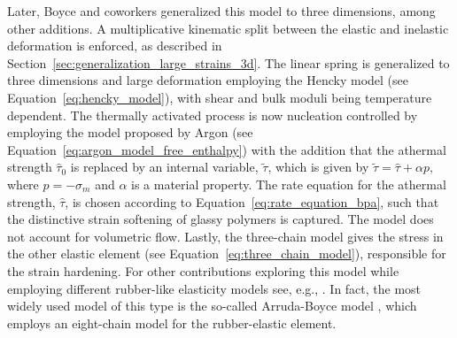 Later, Boyce and coworkers \citep{boyceLargeInelasticDeformation1988} generalized this model to three dimensions, among other additions.
A multiplicative kinematic split between the elastic and inelastic deformation is enforced, as described in Section~\ref{sec:generalization_large_strains_3d}.
The linear spring is generalized to three dimensions and large deformation employing the Hencky model (see Equation~\eqref{eq:hencky_model}), with shear and bulk moduli being temperature dependent.
The thermally activated process is now nucleation controlled by employing the model proposed by Argon \citep{argonTheoryLowtemperaturePlastic1973} (see Equation~\eqref{eq:argon_model_free_enthalpy}) with the addition that the athermal strength $\hat \tau_0$ is replaced by an internal variable, $\tilde \tau$, which is given by $\tilde{\tau}=\hat \tau+\alpha p,$ where $p=-\sigma_m$ and $\alpha$ is a material property.
The rate equation for the athermal strength, $\hat \tau$, is chosen according to Equation~\eqref{eq:rate_equation_bpa}, such that the distinctive strain softening of glassy polymers is captured.
The model does not account for volumetric flow.
Lastly, the three-chain model gives the stress in the other elastic element (see Equation~\eqref{eq:three_chain_model}), responsible for the strain hardening.
For other contributions exploring this model while employing different rubber-like elasticity models see, e.g., \cite{arrudaEvolutionPlasticAnisotropy1993, arrudaEffectsStrainRate1995, wuImprovedNetworkModels1993, buckleyGlassrubberConstitutiveModel1995, sweeneyRateDependentNetwork1995}.
In fact, the most widely used model of this type is the so-called Arruda-Boyce model \citep{arrudaEvolutionPlasticAnisotropy1993, arrudaEffectsStrainRate1995}, which employs an eight-chain model for the rubber-elastic element.

